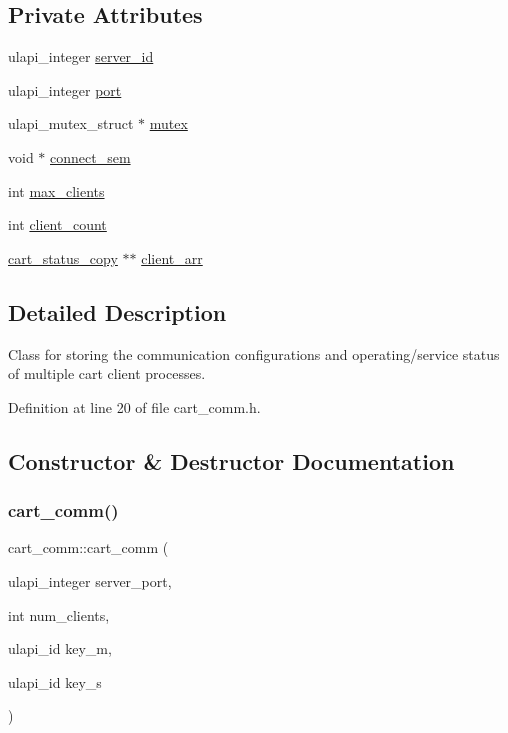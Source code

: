 \subsection*{Private Attributes}
\begin{DoxyCompactItemize}
\item 
ulapi\+\_\+integer \mbox{\hyperlink{classcart__comm_a462fbce6dc2408c12ce9de2f4d960f6f}{server\+\_\+id}}
\item 
ulapi\+\_\+integer \mbox{\hyperlink{classcart__comm_ac280d2562b45d4f21187f95d573b454a}{port}}
\item 
ulapi\+\_\+mutex\+\_\+struct $\ast$ \mbox{\hyperlink{classcart__comm_a02a98a6ee6885d5521590db05650ad41}{mutex}}
\item 
void $\ast$ \mbox{\hyperlink{classcart__comm_ab7920bad120f065ea615161aa31c9d7e}{connect\+\_\+sem}}
\item 
int \mbox{\hyperlink{classcart__comm_aaba30e6cd9bf524718862b8171dec9b3}{max\+\_\+clients}}
\item 
int \mbox{\hyperlink{classcart__comm_ad335e930dcf3978785a97841e8affe52}{client\+\_\+count}}
\item 
\mbox{\hyperlink{classcart__status__copy}{cart\+\_\+status\+\_\+copy}} $\ast$$\ast$ \mbox{\hyperlink{classcart__comm_ae5a8dcabaa03d74ec04a5590e738a596}{client\+\_\+arr}}
\end{DoxyCompactItemize}


\subsection{Detailed Description}
Class for storing the communication configurations and operating/service status of multiple cart client processes. 

Definition at line 20 of file cart\+\_\+comm.\+h.



\subsection{Constructor \& Destructor Documentation}
\mbox{\label{classcart__comm_ab336b3d84b33ef32621e083dd4006b67}} 
\subsubsection{\texorpdfstring{cart\+\_\+comm()}{cart\_comm()}}
{\footnotesize\ttfamily cart\+\_\+comm\+::cart\+\_\+comm (\begin{DoxyParamCaption}\item[{ulapi\+\_\+integer}]{server\+\_\+port,  }\item[{int}]{num\+\_\+clients,  }\item[{ulapi\+\_\+id}]{key\+\_\+m,  }\item[{ulapi\+\_\+id}]{key\+\_\+s }\end{DoxyParamCaption})}

